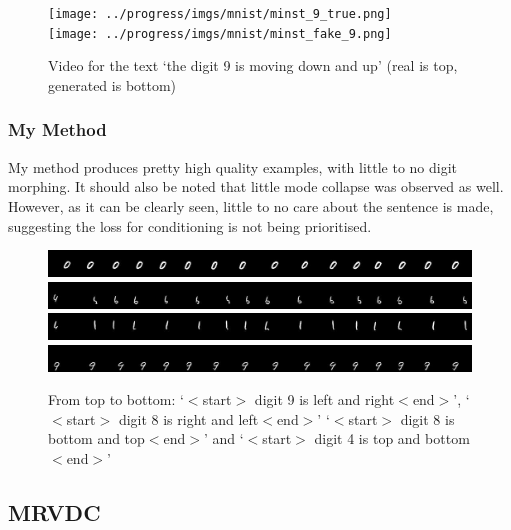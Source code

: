 \documentclass{report}
\theoremstyle{plain}
\theoremstyle{definition}
\theoremstyle{remark}
\numberwithin{equation}{section}
\numberwithin{figure}{section}
\newcommand{\<}{\langle}
\renewcommand{\>}{\rangle}
\begin{document}
\begin{figure}[H]\label{fig:wrongdir_base}
    \centering
    \caption{Video for the text `the digit 9 is moving down and up' (real is top, generated is bottom)}
    \texttt{[image: ../progress/imgs/mnist/minst\_9\_true.png]}\\
    \texttt{[image: ../progress/imgs/mnist/minst\_fake\_9.png]}
\end{figure}


\subsubsection{My Method}
My method produces pretty high quality examples, with little to no digit morphing. It should also be noted that little mode collapse was observed as well. However, as it can be clearly seen, little to no care about the sentence is made, suggesting the loss for conditioning is not being prioritised.

\begin{figure}[H] \label{fig:my_no_corr}
    \centering
    \caption{From top to bottom: `$<$start$>$ digit 9 is left and right$<$end$>$', `$<$start$>$ digit 8 is right and left$<$end$>$' `$<$start$>$ digit 8 is bottom and top$<$end$>$' and `$<$start$>$ digit 4 is top and bottom$<$end$>$'}
    \includegraphics[width=0.8\linewidth]{images/cond_mnist/1.jpg}\\
    \includegraphics[width=0.8\linewidth]{images/cond_mnist/2.jpg}\\
    \includegraphics[width=0.8\linewidth]{images/cond_mnist/3.jpg}\\
    \includegraphics[width=0.8\linewidth]{images/cond_mnist/4.jpg}\\
\end{figure}

\subsection{MRVDC}
\end{document}
